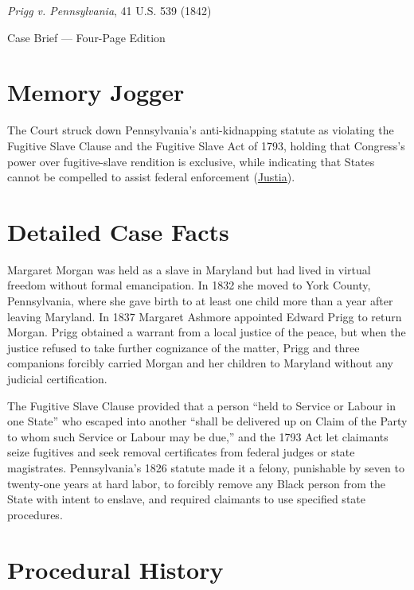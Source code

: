 \documentclass[12pt]{article}
\begin{document}
\begin{center}
{\LARGE \textit{Prigg v. Pennsylvania}, 41 U.S. 539 (1842)\par}
\vspace{0.8em}
{\large Case Brief --- Four-Page Edition\par}
\end{center}
\vspace{1em}

\section{Memory Jogger}

The Court struck down Pennsylvania's anti-kidnapping statute as violating the Fugitive Slave Clause and the Fugitive Slave Act of 1793, holding that Congress's power over fugitive-slave rendition is exclusive, while indicating that States cannot be compelled to assist federal enforcement (\href{https://supreme.justia.com/cases/federal/us/41/539/}{Justia}).

\section{Detailed Case Facts}

Margaret Morgan was held as a slave in Maryland but had lived in virtual freedom without formal emancipation. In 1832 she moved to York County, Pennsylvania, where she gave birth to at least one child more than a year after leaving Maryland. In 1837 Margaret Ashmore appointed Edward Prigg to return Morgan. Prigg obtained a warrant from a local justice of the peace, but when the justice refused to take further cognizance of the matter, Prigg and three companions forcibly carried Morgan and her children to Maryland without any judicial certification.

The Fugitive Slave Clause provided that a person ``held to Service or Labour in one State'' who escaped into another ``shall be delivered up on Claim of the Party to whom such Service or Labour may be due,'' and the 1793 Act let claimants seize fugitives and seek removal certificates from federal judges or state magistrates. Pennsylvania's 1826 statute made it a felony, punishable by seven to twenty-one years at hard labor, to forcibly remove any Black person from the State with intent to enslave, and required claimants to use specified state procedures.

\section{Procedural History}
\end{document}
